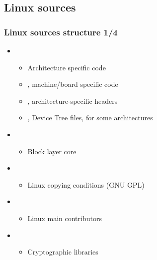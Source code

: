\subsection{Linux sources}

\begin{frame}
  \frametitle{Linux sources structure 1/4}
  \begin{itemize}
  \item {}
    \begin{itemize}
    \item Architecture specific code
    \item {}, machine/board
      specific code
    \item {}, architecture-specific
      headers
    \item {}, Device Tree files, for
      some architectures
    \end{itemize}
  \item {}
    \begin{itemize}
    \item Block layer core
    \end{itemize}
  \item {}
    \begin{itemize}
    \item Linux copying conditions (GNU GPL)
    \end{itemize}
  \item {}
    \begin{itemize}
    \item Linux main contributors
    \end{itemize}
  \item {}
    \begin{itemize}
    \item Cryptographic libraries
    \end{itemize}
  \end{itemize}
\end{frame}

